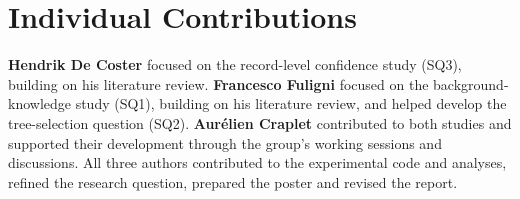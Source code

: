 \section*{Individual Contributions}

\textbf{Hendrik De Coster} focused on the record-level confidence study (SQ3), building
on his literature review. \textbf{Francesco Fuligni} focused on the background-knowledge
study (SQ1), building on his literature review, and helped develop the tree-selection
question (SQ2). \textbf{Aur\'elien Craplet} contributed to both studies and supported
their development through the group's working sessions and discussions. All three authors
contributed to the experimental code and analyses, refined the research question,
prepared the poster and revised the report.
